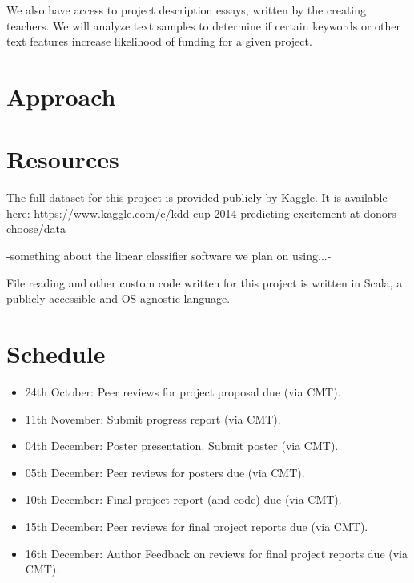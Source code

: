 \documentclass{article}
\begin{document}
We also have access to project description essays, written by the creating teachers. We will analyze text samples to determine if certain keywords or other text features increase likelihood of funding for a given project.
\section{Approach}


\section{Resources}
The full dataset for this project is provided publicly by Kaggle. It is available here: https://www.kaggle.com/c/kdd-cup-2014-predicting-excitement-at-donors-choose/data

-something about the linear classifier software we plan on using...-

File reading and other custom code written for this project is written in Scala, a publicly accessible and OS-agnostic language.
\section{Schedule}

\begin{itemize}
\item 24th October: Peer reviews for project proposal due (via CMT).
\item 11th November: Submit progress report (via CMT).
\item 04th December: Poster presentation. Submit poster (via CMT).
\item 05th December: Peer reviews for posters due (via CMT).
\item 10th December: Final project report (and code) due (via CMT).
\item 15th December: Peer reviews for final project reports due (via CMT).
\item 16th December: Author Feedback on reviews for final project reports due (via CMT).
\end{itemize}
\end{document}
